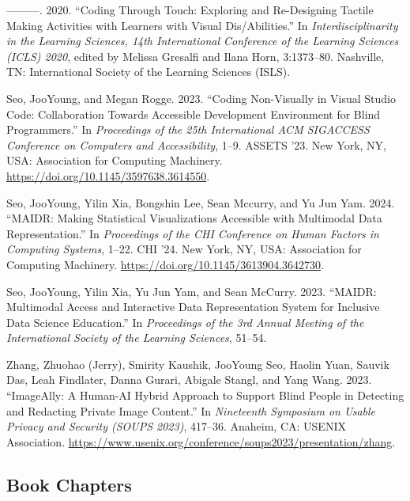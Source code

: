 \documentclass[11pt,a4paper,]{awesome-cv}
\newlength{\cslhangindent}
\newenvironment{CSLReferences}[2] %
 {\begin{list}{}{%
  \setlength{\itemindent}{0pt}
  \setlength{\leftmargin}{0pt}
  \setlength{\parsep}{0pt}
  \ifodd #1
   \setlength{\leftmargin}{\cslhangindent}
   \setlength{\itemindent}{-1\cslhangindent}
  \fi
  \setlength{\itemsep}{#2\baselineskip}}}
 {\end{list}}
\begin{document}
\begin{CSLReferences}{1}{0}
---------. 2020. {``Coding Through Touch: Exploring and Re-Designing
Tactile Making Activities with Learners with Visual Dis/Abilities.''} In
\emph{Interdisciplinarity in the Learning Sciences, 14th International
Conference of the Learning Sciences (ICLS) 2020}, edited by Melissa
Gresalfi and Ilana Horn, 3:1373--80. Nashville, TN: International
Society of the Learning Sciences (ISLS).

Seo, JooYoung, and Megan Rogge. 2023. {``Coding Non-Visually in Visual
Studio Code: Collaboration Towards Accessible Development Environment
for Blind Programmers.''} In \emph{Proceedings of the 25th International
ACM SIGACCESS Conference on Computers and Accessibility}, 1--9. ASSETS
'23. New York, NY, USA: Association for Computing Machinery.
\url{https://doi.org/10.1145/3597638.3614550}.

Seo, JooYoung, Yilin Xia, Bongshin Lee, Sean Mccurry, and Yu Jun Yam.
2024. {``MAIDR: Making Statistical Visualizations Accessible with
Multimodal Data Representation.''} In \emph{Proceedings of the CHI
Conference on Human Factors in Computing Systems}, 1--22. CHI '24. New
York, NY, USA: Association for Computing Machinery.
\url{https://doi.org/10.1145/3613904.3642730}.

Seo, JooYoung, Yilin Xia, Yu Jun Yam, and Sean McCurry. 2023. {``MAIDR:
Multimodal Access and Interactive Data Representation System for
Inclusive Data Science Education.''} In \emph{Proceedings of the 3rd
Annual Meeting of the International Society of the Learning Sciences},
51--54.

Zhang, Zhuohao (Jerry), Smirity Kaushik, JooYoung Seo, Haolin Yuan,
Sauvik Das, Leah Findlater, Danna Gurari, Abigale Stangl, and Yang Wang.
2023. {``ImageAlly: A Human-AI Hybrid Approach to Support Blind People
in Detecting and Redacting Private Image Content.''} In \emph{Nineteenth
Symposium on Usable Privacy and Security (SOUPS 2023)}, 417--36.
Anaheim, CA: USENIX Association.
\url{https://www.usenix.org/conference/soups2023/presentation/zhang}.

\end{CSLReferences}

\subsection{Book Chapters}\label{book-chapters}
\end{document}
